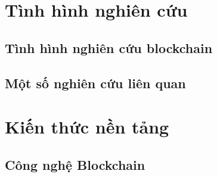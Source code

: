 \documentclass[../main-report.tex]{subfiles}
\begin{document}
\section{Tình hình nghiên cứu}
\subsection{Tình hình nghiên cứu blockchain}

\subsection{Một số nghiên cứu liên quan}

\section{Kiến thức nền tảng}
\subsection{Công nghệ Blockchain}
\end{document}
